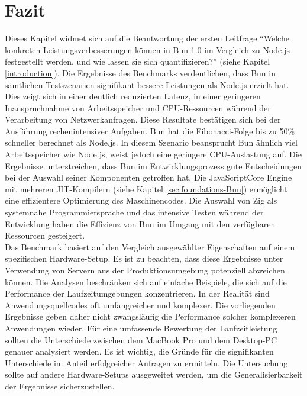 \section{Fazit} \label{sec:performance-conclusion}
Dieses Kapitel widmet sich auf die Beantwortung der ersten Leitfrage ``Welche konkreten Leistungsverbesserungen können in Bun 1.0 im Vergleich zu Node.js festgestellt werden, und wie lassen sie sich quantifizieren?'' (siehe Kapitel \ref{introduction}). Die Ergebnisse des Benchmarks verdeutlichen, dass Bun in sämtlichen Testszenarien signifikant bessere Leistungen als Node.js erzielt hat. Dies zeigt sich in einer deutlich reduzierten Latenz, in einer geringeren Inanspruchnahme von Arbeitsspeicher und CPU-Ressourcen während der Verarbeitung von Netzwerkanfragen. Diese Resultate bestätigen sich bei der Ausführung rechenintensiver Aufgaben. Bun hat die Fibonacci-Folge bis zu 50\% schneller berechnet als Node.js. In diesem Szenario beansprucht Bun ähnlich viel Arbeitsspeicher wie Node.js, weist jedoch eine geringere CPU-Auslastung auf. \newline
Die Ergebnisse unterstreichen, dass Bun im Entwicklungsprozess gute Entscheidungen bei der Auswahl seiner Komponenten getroffen hat. Die JavaScriptCore Engine mit mehreren JIT-Kompilern (siehe Kapitel \ref{sec:foundations-Bun}) ermöglicht eine effizientere Optimierung des Maschinencodes. Die Auswahl von Zig als systemnahe Programmiersprache und das intensive Testen während der Entwicklung haben die Effizienz von Bun im Umgang mit den verfügbaren Ressourcen gesteigert.\\

\noindent
Das Benchmark basiert auf den Vergleich ausgewählter Eigenschaften auf einem spezifischen Hardware-Setup. Es ist zu beachten, dass diese Ergebnisse unter Verwendung von Servern aus der Produktionsumgebung potenziell abweichen können. Die Analysen beschränken sich auf einfache Beispiele, die sich auf die Performance der Laufzeitumgebungen konzentrieren. In der Realität sind Anwendungsquellcodes oft umfangreicher und komplexer. Die vorliegenden Ergebnisse geben daher nicht zwangsläufig die Performance solcher komplexeren Anwendungen wieder. Für eine umfassende Bewertung der Laufzeitleistung sollten die Unterschiede zwischen dem MacBook Pro und dem Desktop-PC genauer analysiert werden. Es ist wichtig, die Gründe für die signifikanten Unterschiede im Anteil erfolgreicher Anfragen zu ermitteln. Die Untersuchung sollte auf andere Hardware-Setups ausgeweitet werden, um die Generalisierbarkeit der Ergebnisse sicherzustellen.
